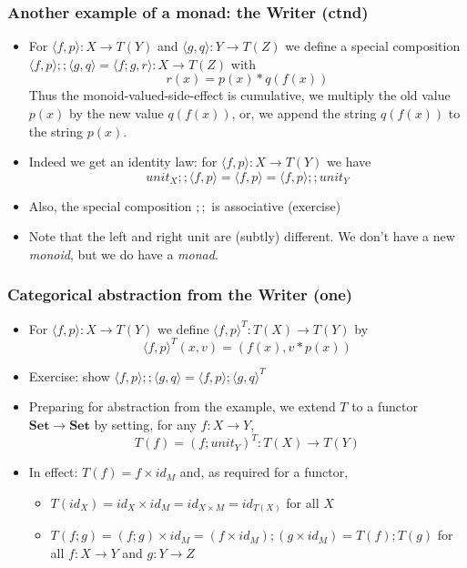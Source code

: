 \documentclass[handout]{beamer}
\newcommand{\bfsf}[1]{{\boldsymbol{#1}}}
\newcommand{\Set}{\bfsf{Set}}
\newcommand{\Kp}[1]{{\langle #1 \rangle}}
\newcommand{\Kc}{;\!;}
\begin{document}
\frame
  {   
    \frametitle{Another example of a monad: the Writer (ctnd)}\label{Mon5:ExaSetMctnd}

 \begin{itemize}[<+->]
\item For $\Kp{f,p}: X\to T(Y)$ and $\Kp{g,q}: Y\to T(Z)$ we define a special
composition $\Kp{f,p}\Kc \Kp{g,q} = \Kp{f;g,r} : X\to T(Z)$ with $$r(x)=p(x)*q(f(x))$$
Thus the monoid-valued-side-effect is cumulative,
we multiply the old value $p(x)$ by the new value $q(f(x))$,
or, we append the string $q(f(x))$ to the string $p(x)$.
\item Indeed we get an identity law: for $\Kp{f,p}: X\to T(Y)$ we have
$$unit_X\Kc \Kp{f,p}  = \Kp{f,p} = \Kp{f,p}\Kc unit_Y$$
\item Also, the special composition $\Kc$ is associative  (exercise)
\item Note that the left and right unit are (subtly) different.
We don't have a new \emph{monoid}, but we do have a \emph{monad}.
 \end{itemize}

 }

\frame
  {   
    \frametitle{Categorical abstraction from the Writer (one)}\label{Mon5:CatAbstrOne}

 \begin{itemize}[<+->]
\item For $\Kp{f,p} : X\to T(Y)$ we define $\Kp{f,p}^T : T(X)\to T(Y)$ by
$$\Kp{f,p}^T(x,v) = (f(x),v*p(x))$$
\item Exercise: show $\Kp{f,p}\Kc\Kp{g,q} = \Kp{f,p};\Kp{g,q}^T$
\item Preparing for abstraction from the example,
we extend $T$ to a functor $\Set\to\Set$ 
by setting, for any $f:X\to Y$,  $$T(f) = (f; unit_Y)^T : T(X)\to T(Y)$$
\item In effect: $T(f) = f\times id_M$ and, as required for a functor,
\begin{itemize}
\item
$T(id_X) = id_X \times id_M = id_{X\times M} = id_{T(X)}$  for all $X$
\item $T(f;g) = (f;g)\times id_M = (f\times id_M);(g\times id_M) = T(f); T(g)$
for all $f:X\to Y$ and $g:Y\to Z$
\end{itemize}
 \end{itemize}

 }
\end{document}
